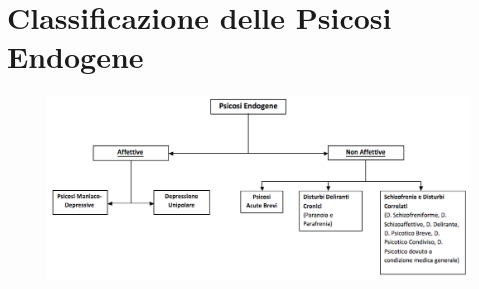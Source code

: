 \section{Classificazione delle Psicosi Endogene}

\begin{figure}[!ht]
\centering
	\includegraphics[width=1\textwidth]{05/image1.png}
\end{figure}
